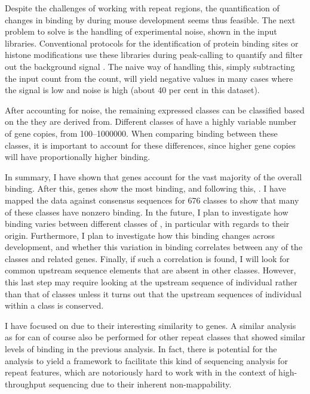 Despite the challenges of working with repeat regions, the quantification of
changes in \transsine binding by  during mouse development seems thus
feasible. The next problem to solve is the handling of experimental noise, shown
in the input libraries. Conventional \chipseq protocols for the identification
of protein binding sites or histone modifications use these libraries during
peak-calling to quantify and filter out the background signal
\citep{Zhang:2008}. The naive way of handling this, simply subtracting the input
count from the  count, will yield negative values in many cases where the
signal is low and noise is high (about \num{40} per cent in this dataset).

After accounting for noise, the remaining expressed \transsine classes can be
classified based on the \rna they are derived from. Different classes of
\transsine have a highly variable number of gene copies, from
\numrange{100}{1000000}. When comparing  binding between these classes,
it is important to account for these differences, since higher gene copies will
have proportionally high\-er binding.

\parrule

In summary, I have shown that \trna genes account for the vast majority of the
overall  binding. After this, \rrna genes show the most binding, and
following this, \transsine[s]. I have mapped the  \chip data against
consensus sequences for \num{676} \transsine classes to show that many of these
classes have nonzero  binding. In the future, I plan to investigate how
 binding varies between different classes of \transsine[s], in particular
with regards to their origin. Furthermore, I plan to investigate how this
binding changes across development, and whether this variation in binding
correlates between any of the \transsine classes and related \trna genes.
Finally, if such a correlation is found, I will look for common upstream
sequence elements that are absent in other \transsine classes. However, this
last step may require looking at the upstream sequence of individual
\transsine[s] rather than that of \transsine classes unless it turns out that
the upstream sequences of individual \transsine[s] within a class is conserved.

I have focused on \transsine[s] due to their interesting similarity to \trna
genes. A similar analysis as for \transsine[s] can of course also be performed
for other repeat classes that showed similar levels of  binding in the
previous analysis. In fact, there is potential for the \transsine analysis to
yield a framework to facilitate this kind of sequencing analysis for repeat
features, which are notoriously hard to work with in the context of
high-throughput sequencing due to their inherent non-mappability.
